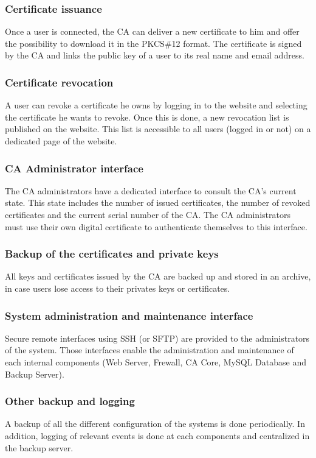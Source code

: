 \documentclass[english]{article}
\begin{document}
\subsubsection{Certificate issuance}
Once a user is connected, the CA can deliver a new certificate to him and offer the possibility to download it in the PKCS\#12 format. The certificate is signed by the CA and links the public key of a user to its real name and email address.

\subsubsection{Certificate revocation}
A user can revoke a certificate he owns by logging in to the website and selecting the certificate he wants to revoke. Once this is done, a new revocation list is published on the website. This list is accessible to all users (logged in or not) on a dedicated page of the website.

\subsubsection{CA Administrator interface}
The CA administrators have a dedicated interface to consult the CA's current state. This state includes the number of issued certificates, the number of revoked certificates and the current serial number of the CA. The CA administrators must use their own digital certificate to authenticate themselves to this interface.

\subsubsection{Backup of the certificates and private keys}
All keys and certificates issued by the CA are backed up and stored in an archive, in case users lose access to their privates keys or certificates.

\subsubsection{System administration and maintenance interface}
Secure remote interfaces using SSH (or SFTP) are provided to the
administrators of the system. Those interfaces enable the administration and maintenance of each internal components (Web Server, Frewall, CA Core, MySQL Database and Backup Server).

\subsubsection{Other backup and logging}
A backup of all the different configuration of the systems is done periodically. In addition, logging of relevant events is done at each components and centralized in the backup server.
\end{document}
